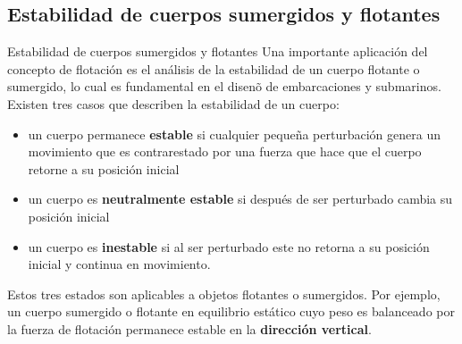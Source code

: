 \documentclass [xcolor=svgnames, t] {beamer}
\begin{document}
\subsection{Estabilidad de cuerpos sumergidos y flotantes}
\begin{frame}{Estabilidad de cuerpos sumergidos y flotantes}
Una importante aplicaci\'on del concepto de flotaci\'on es el an\'alisis de la estabilidad de un cuerpo flotante o sumergido, lo cual es fundamental en el disen\~o de embarcaciones y submarinos. Existen tres casos que describen la estabilidad de un cuerpo: 
\begin{itemize}
\item un cuerpo permanece \textbf{estable} si cualquier peque\~na perturbaci\'on genera un movimiento que es contrarestado por una fuerza que hace que el cuerpo retorne a su posici\'on inicial
\item un cuerpo es \textbf{neutralmente estable} si despu\'es de ser perturbado cambia su posici\'on inicial
\item un cuerpo es \textbf{inestable} si al ser perturbado este no retorna a su posici\'on inicial y continua en movimiento. 
\end{itemize}
Estos tres estados son aplicables a objetos flotantes o sumergidos. Por ejemplo, un cuerpo sumergido o flotante en equilibrio est\'atico cuyo peso es balanceado por la fuerza de flotaci\'on permanece estable en la \textbf{direcci\'on vertical}.
\end{frame}
\end{document}

